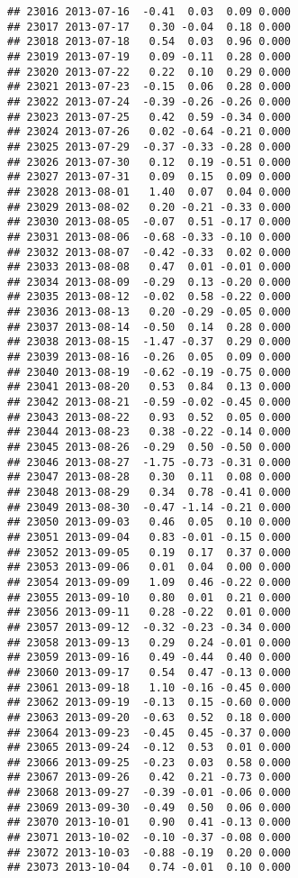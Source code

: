 \documentclass[
]{article}
\begin{document}
\begin{verbatim}
## 23016 2013-07-16  -0.41  0.03  0.09 0.000
## 23017 2013-07-17   0.30 -0.04  0.18 0.000
## 23018 2013-07-18   0.54  0.03  0.96 0.000
## 23019 2013-07-19   0.09 -0.11  0.28 0.000
## 23020 2013-07-22   0.22  0.10  0.29 0.000
## 23021 2013-07-23  -0.15  0.06  0.28 0.000
## 23022 2013-07-24  -0.39 -0.26 -0.26 0.000
## 23023 2013-07-25   0.42  0.59 -0.34 0.000
## 23024 2013-07-26   0.02 -0.64 -0.21 0.000
## 23025 2013-07-29  -0.37 -0.33 -0.28 0.000
## 23026 2013-07-30   0.12  0.19 -0.51 0.000
## 23027 2013-07-31   0.09  0.15  0.09 0.000
## 23028 2013-08-01   1.40  0.07  0.04 0.000
## 23029 2013-08-02   0.20 -0.21 -0.33 0.000
## 23030 2013-08-05  -0.07  0.51 -0.17 0.000
## 23031 2013-08-06  -0.68 -0.33 -0.10 0.000
## 23032 2013-08-07  -0.42 -0.33  0.02 0.000
## 23033 2013-08-08   0.47  0.01 -0.01 0.000
## 23034 2013-08-09  -0.29  0.13 -0.20 0.000
## 23035 2013-08-12  -0.02  0.58 -0.22 0.000
## 23036 2013-08-13   0.20 -0.29 -0.05 0.000
## 23037 2013-08-14  -0.50  0.14  0.28 0.000
## 23038 2013-08-15  -1.47 -0.37  0.29 0.000
## 23039 2013-08-16  -0.26  0.05  0.09 0.000
## 23040 2013-08-19  -0.62 -0.19 -0.75 0.000
## 23041 2013-08-20   0.53  0.84  0.13 0.000
## 23042 2013-08-21  -0.59 -0.02 -0.45 0.000
## 23043 2013-08-22   0.93  0.52  0.05 0.000
## 23044 2013-08-23   0.38 -0.22 -0.14 0.000
## 23045 2013-08-26  -0.29  0.50 -0.50 0.000
## 23046 2013-08-27  -1.75 -0.73 -0.31 0.000
## 23047 2013-08-28   0.30  0.11  0.08 0.000
## 23048 2013-08-29   0.34  0.78 -0.41 0.000
## 23049 2013-08-30  -0.47 -1.14 -0.21 0.000
## 23050 2013-09-03   0.46  0.05  0.10 0.000
## 23051 2013-09-04   0.83 -0.01 -0.15 0.000
## 23052 2013-09-05   0.19  0.17  0.37 0.000
## 23053 2013-09-06   0.01  0.04  0.00 0.000
## 23054 2013-09-09   1.09  0.46 -0.22 0.000
## 23055 2013-09-10   0.80  0.01  0.21 0.000
## 23056 2013-09-11   0.28 -0.22  0.01 0.000
## 23057 2013-09-12  -0.32 -0.23 -0.34 0.000
## 23058 2013-09-13   0.29  0.24 -0.01 0.000
## 23059 2013-09-16   0.49 -0.44  0.40 0.000
## 23060 2013-09-17   0.54  0.47 -0.13 0.000
## 23061 2013-09-18   1.10 -0.16 -0.45 0.000
## 23062 2013-09-19  -0.13  0.15 -0.60 0.000
## 23063 2013-09-20  -0.63  0.52  0.18 0.000
## 23064 2013-09-23  -0.45  0.45 -0.37 0.000
## 23065 2013-09-24  -0.12  0.53  0.01 0.000
## 23066 2013-09-25  -0.23  0.03  0.58 0.000
## 23067 2013-09-26   0.42  0.21 -0.73 0.000
## 23068 2013-09-27  -0.39 -0.01 -0.06 0.000
## 23069 2013-09-30  -0.49  0.50  0.06 0.000
## 23070 2013-10-01   0.90  0.41 -0.13 0.000
## 23071 2013-10-02  -0.10 -0.37 -0.08 0.000
## 23072 2013-10-03  -0.88 -0.19  0.20 0.000
## 23073 2013-10-04   0.74 -0.01  0.10 0.000

\end{verbatim}
\end{document}
